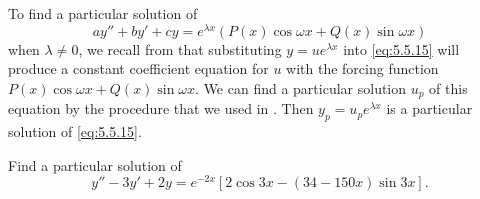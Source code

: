 To find a particular solution of
\begin{equation} \label{eq:5.5.15}
ay''+by'+cy=e^{\lambda x}\left(P(x)\cos \omega x+Q(x)\sin \omega x\right)
\end{equation}
when $\lambda\ne0$, we recall from  that
substituting $y=ue^{\lambda x}$ into \eqref{eq:5.5.15} will produce a
constant coefficient equation for $u$  with  the forcing
function  $P(x)\cos \omega x+Q(x)\sin \omega x$. We can find a
particular solution $u_p$ of this equation by the procedure that we
used in . Then
$y_p=u_pe^{\lambda x}$ is a particular solution of \eqref{eq:5.5.15}.

\begin{example}\label{example:5.5.5}
Find a particular solution of
\begin{equation} \label{eq:5.5.16}
y''-3y'+2y=e^{-2x}\left[2\cos 3x-(34-150x)\sin 3x\right].
\end{equation}
\end{example}

